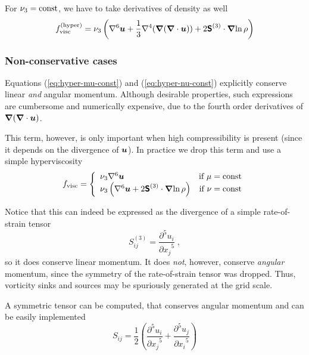 \documentclass[\mydriver,12pt,twoside,notitlepage,a4paper]{article}
\renewcommand{\vec}[1]{\mbox{\boldmath{$#1$}}}
\newcommand{\grad}    {\vec{\nabla}}
\newcommand{\Div}     {\vec{\nabla}\cdot}
\newcommand{\pderivn}[3]{\frac{{\partial{}}^{#3} #1}{{\partial #2}^{#3}}}
\newcommand{\uv}            {\vec{u}}
\newcommand{\Strain}        {\boldsymbol{\mathsf{S}}}
\begin{document}
For $\nu_3={\rm const}$, we have to take derivatives of density as well
\begin{equation}
  \label{eq:hyper-nu-const}
  f_{\rm visc}^{({\rm hyper})} = \nu_3 \left(
    \nabla^6\uv + \frac{1}{3}\nabla^4({\grad({\Div{\uv}})}) +
    2\Strain^{(3)}\cdot\grad{\ln\rho}
 \right)
\end{equation}


\subsubsection{Non-conservative cases}

Equations (\ref{eq:hyper-mu-const}) and (\ref{eq:hyper-nu-const})
explicitly conserve linear {\em and} angular momentum.
Although desirable properties, such expressions are cumbersome and
numerically expensive, due to the fourth order derivatives of
$\grad({\Div{\uv}})$.


This term, however, is only important when high compressibility is present
(since it depends on the divergence of $\uv$).
In practice we drop this term and use a simple hyperviscosity
\begin{equation}
  f_{\rm visc}
    = \left\{
        \begin{array}{l r}
          \nu_3 \nabla^6\uv   &\mbox{if $\mu={\rm const}$} \\
          \nu_3 \left(\nabla^6\uv
            + 2\Strain^{(3)}\cdot\grad{\ln\rho} \right)
                              &\mbox{if $\nu={\rm const}$}
        \end{array}
      \right.
\end{equation}

Notice that this can indeed be expressed as the divergence of a simple
rate-of-strain tensor
\begin{equation}
  \label{eq:weird-strain}
  S_{ij}^{(3)} = \pderivn{u_i}{x_j}{5} \; ,
\end{equation}
so it does conserve linear momentum.
It does {\it not}, however, conserve {\it angular} momentum, since the
symmetry of the rate-of-strain tensor was dropped.
Thus, vorticity sinks and sources may be spuriously generated at the grid
scale.

A symmetric tensor can be computed, that conserves angular momentum and
can be easily implemented
\begin{equation}
  \label{eq:symmetric-strain}
  S_{ij} = \frac{1}{2}
           \left(
             \pderivn{u_i}{x_j}{5} + \pderivn{u_j}{x_i}{5}
           \right)
\end{equation}
\end{document}
